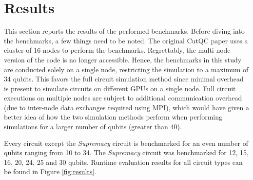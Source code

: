 \section{Results}
\label{chap:results}

This section reports the results of the performed benchmarks. Before diving into the benchmarks, a few things need to be noted. The original CutQC paper uses a cluster of 16 nodes to perform the benchmarks. Regrettably, the multi-node version of the code is no longer accessible. Hence, the benchmarks in this study are conducted solely on a single node, restricting the simulation to a maximum of 34 qubits. This favors the full circuit simulation method since minimal overhead is present to simulate circuits on different GPUs on a single node. Full circuit executions on multiple nodes are subject to additional communication overhead (due to inter-node data exchanges required using MPI), which would have given a better idea of how the two simulation methods perform when performing simulations for a larger number of qubits (greater than 40).

\vspace{\baselineskip}
\vspace{\baselineskip}
Every circuit except the \textit{Supremacy} circuit is benchmarked for an even number of qubits ranging from 10 to 34. The \textit{Supremacy} circuit was benchmarked for 12, 15, 16, 20, 24, 25 and 30 qubits. Runtime evaluation results for all circuit types can be found in Figure \ref{fig:results}.


